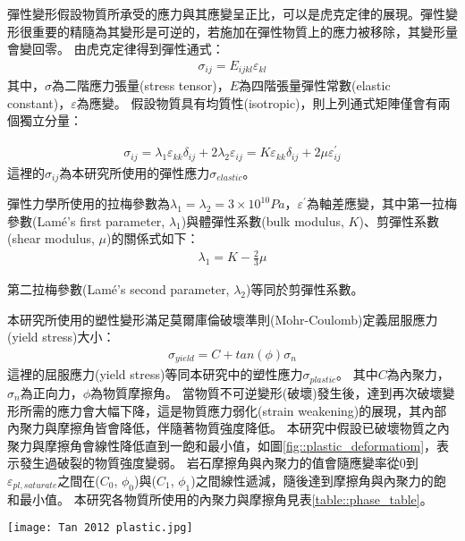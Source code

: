 彈性變形假設物質所承受的應力與其應變呈正比，可以是虎克定律的展現。彈性變形很重要的精隨為其變形是可逆的，若施加在彈性物質上的應力被移除，其變形量會變回零。
由虎克定律得到彈性通式：
\begin{align}
\sigma_{ij}=E_{ijkl} \varepsilon_{kl}
\end{align}
其中，$\sigma$為二階應力張量(stress tensor)，$E$為四階張量彈性常數(elastic constant)，$\varepsilon$為應變。
假設物質具有均質性(isotropic)，則上列通式矩陣僅會有兩個獨立分量：

\begin{align}
    \sigma_{ij}=\lambda_1 \varepsilon_{kk} \delta_{ij}+2 \lambda_2 \varepsilon_{ij}=K\varepsilon_{kk} \delta_{ij}+2 \mu \varepsilon_{ij}^{'} \label{eqn:elastic tensor}
\end{align}
這裡的$\sigma_{ij}$為本研究所使用的彈性應力$\sigma_{elastic}$。

彈性力學所使用的拉梅參數為$\lambda_1 = \lambda_2 = 3 \times 10^{10} Pa$，$\varepsilon^{'}$為軸差應變，其中第一拉梅參數(Lamé's first parameter, $\lambda_1$)與體彈性系數(bulk modulus, $K$)、剪彈性系數(shear modulus, $\mu$)的關係式如下：
\begin{align}
\lambda_1 = K - \frac{2}{3}\mu
\end{align}

第二拉梅參數(Lamé's second parameter, $\lambda_2$)等同於剪彈性系數。

本研究所使用的塑性變形滿足莫爾庫倫破壞準則(Mohr-Coulomb)定義屈服應力(yield stress)大小：
\begin{align}
    \sigma_{yield}=C+tan(\phi)\sigma_{n}\label{eqn:plastic deformation}
\end{align}
這裡的屈服應力(yield stress)等同本研究中的塑性應力$\sigma_{plastic}$。
其中$C$為內聚力，$\sigma_n$為正向力，$\phi$為物質摩擦角。
當物質不可逆變形(破壞)發生後，達到再次破壞變形所需的應力會大幅下降，這是物質應力弱化(strain weakening)的展現，其內部內聚力與摩擦角皆會降低，伴隨著物質強度降低。
本研究中假設已破壞物質之內聚力與摩擦角會線性降低直到一飽和最小值，如圖\ref{fig::plastic_deformatiom}，表示發生過破裂的物質強度變弱。
岩石摩擦角與內聚力的值會隨應變率從0到$\varepsilon_{pl,saturate}$之間在($C_0$, $\phi_0$)與($C_1$, $\phi_1$)之間線性遞減，隨後達到摩擦角與內聚力的飽和最小值。
本研究各物質所使用的內聚力與摩擦角見表\ref{table::phase_table}。
\begin{figure*}[ht!]
    \centering
    \texttt{[image: Tan 2012 plastic.jpg]}
    \caption[應力弱化示意圖，摘自\citealp{Tan2012}]{應力弱化示意圖，摘自\citealp{Tan2012}。在應變率為$0$時，岩石摩擦角與內聚力分別為$C_0$, $\phi_0$；在應變率大於$\varepsilon_{pl,saturate}$時，岩石摩擦角與內聚力分別為$C_1$, $\phi_1$。摩擦角與內聚力的值會隨應變率變化在($C_0$, $\phi_0$)與($C_1$, $\phi_1$)之間線性遞減。
    }
    \label{fig::plastic_deformatiom}
\end{figure*}


